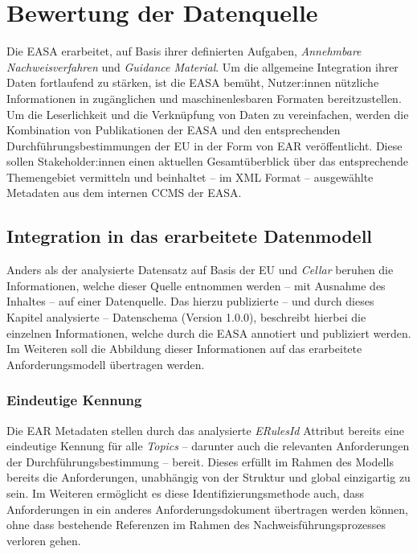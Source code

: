     

    \pagebreak
    \section{Bewertung der Datenquelle}

    Die \acf{EASA} erarbeitet, auf Basis ihrer definierten Aufgaben, \textit{Annehmbare Nachweisverfahren} und \textit{Guidance Material}.
    Um die allgemeine Integration ihrer Daten fortlaufend zu stärken, ist die \ac{EASA} bemüht,  Nutzer:innen nützliche Informationen in zugänglichen und maschinenlesbaren Formaten bereitzustellen. 
    Um die Leserlichkeit und die Verknüpfung von Daten zu vereinfachen, werden die Kombination von Publikationen der \ac{EASA} und den entsprechenden Durchführungsbestimmungen der \ac{EU} in der Form von \acf{EAR} veröffentlicht.
    Diese sollen Stakeholder:innen einen aktuellen Gesamtüberblick über das entsprechende Themengebiet vermitteln und beinhaltet -- im XML Format -- ausgewählte Metadaten aus dem internen \ac{CCMS} der \ac{EASA}.
    


\subsection{Integration in das erarbeitete Datenmodell}

Anders als der analysierte Datensatz auf Basis der \ac{EU} und \textit{Cellar} beruhen die Informationen, welche dieser Quelle entnommen werden -- mit Ausnahme des Inhaltes -- auf einer Datenquelle.
Das hierzu publizierte -- und durch dieses Kapitel analysierte -- Datenschema (Version 1.0.0), beschreibt hierbei die einzelnen Informationen, welche durch die \ac{EASA} annotiert und publiziert werden.
Im Weiteren soll die Abbildung dieser Informationen auf das erarbeitete Anforderungsmodell übertragen werden.

\subsubsection{Eindeutige Kennung}

Die \ac{EAR} Metadaten stellen durch das analysierte \textit{ERulesId} Attribut bereits eine eindeutige Kennung für alle \textit{Topics} -- darunter auch die relevanten Anforderungen der Durchführungsbestimmung -- bereit.
Dieses erfüllt im Rahmen des Modells bereits die Anforderungen, unabhängig von der Struktur und global einzigartig zu sein. 
Im Weiteren ermöglicht es diese Identifizierungsmethode auch, dass Anforderungen in ein anderes Anforderungsdokument übertragen werden können, ohne dass bestehende Referenzen im Rahmen des Nachweisführungsprozesses verloren gehen.

